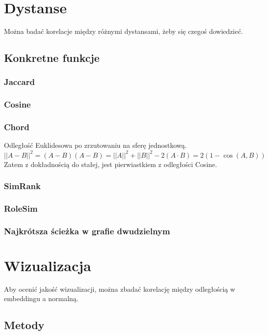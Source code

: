 \documentclass{article}
\begin{document}
\section{Dystanse}

Można badać korelacje między różnymi dystansami, żeby się czegoś dowiedzieć.

\subsection{Konkretne funkcje}

\subsubsection{Jaccard}

\subsubsection{Cosine}

\subsubsection{Chord}

Odległość Euklidesowa po zrzutowaniu na sferę jednostkową.
\[
    ||A - B||^2
    = (A-B)(A-B)
    = ||A||^2 + ||B||^2 - 2 (A \cdot B)
    = 2 (1 - \cos(A, B))
\]
Zatem z dokładnością do stałej, jest pierwiastkiem z odległości Cosine.

\subsubsection{SimRank}

\subsubsection{RoleSim}

\subsubsection{Najkrótsza ścieżka w grafie dwudzielnym}

\section{Wizualizacja}

Aby ocenić jakość wizualizacji, można zbadać korelację między odległością w
embeddingu a normalną.

\subsection{Metody}
\end{document}
